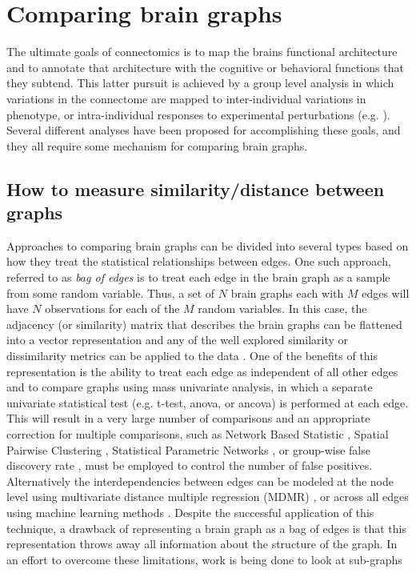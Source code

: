 \section*{Comparing brain graphs} 

The ultimate goals of connectomics is to map the brains functional architecture and to annotate that architecture with the cognitive or behavioral functions that they subtend. This latter pursuit is achieved by a group level analysis in which variations in the connectome are mapped to inter-individual variations in phenotype\cite{Kelly2011}, or intra-individual responses to experimental perturbations (e.g. \cite{Shirer}). Several different analyses have been proposed for accomplishing these goals, and they all require some mechanism for comparing brain graphs. 
 
\subsection*{How to measure similarity/distance between graphs}
Approaches to comparing brain graphs can be divided into several types based on how they treat the statistical relationships between edges. One such approach, referred to as \emph{bag of edges} is to treat each edge in the brain graph as a sample from some random variable. Thus, a set of $N$ brain graphs each with $M$ edges will have $N$ observations for each of the $M$ random variables. In this case, the adjacency (or similarity) matrix that describes the brain graphs can be flattened into a vector representation and any of the well explored similarity or dissimilarity metrics can be applied to the data \cite{Ravindran}. One of the benefits of this representation is the ability to treat each edge as independent of all other edges and to compare graphs using mass univariate analysis, in which a separate univariate statistical test (e.g. t-test, anova, or ancova) is performed at each edge. This will result in a very large number of comparisons and an appropriate correction for multiple comparisons, such as Network Based Statistic \cite{Zalesky2011}, Spatial Pairwise Clustering \cite{Zalesky2012}, Statistical Parametric Networks \cite{Ginestet2013}, or group-wise false discovery rate \cite{}, must be employed to control the number of false positives. Alternatively the interdependencies between edges can be modeled at the node level using multivariate distance multiple regression (MDMR) \cite{Shehzad2014}, or across all edges using machine learning methods \cite{Craddock2009, Dosenbach2010,Richiardi2011}. Despite the successful application of this technique, a drawback of representing a brain graph as a bag of edges is that this representation throws away all information about the structure of the graph.  In an effort to overcome these limitations, work is being done to look at sub-graphs \cite{} 

